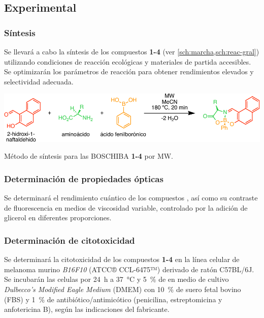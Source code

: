 \subsection{Experimental}
\subsubsection{Síntesis}
Se llevará a cabo la síntesis de los compuestos \textbf{1-4} (ver \cref{sch:marcha,sch:reac-gral}) utilizando condiciones de reacción ecológicas y materiales de partida accesibles. Se optimizarán los parámetros de reacción para obtener rendimientos elevados y selectividad adecuada.

\begin{scheme}[H]
	\centering
	\includegraphics[width=0.85\linewidth]{./Figuras/BO-General.pdf}
	\caption[Síntesis de las BOSCHIBA por MW]{Método de síntesis para las \gls{BOSCHIBA} \textbf{1-4} por \gls{MW}.}
	\label{sch:reac-gral}
\end{scheme}

\subsubsection{Determinación de propiedades ópticas}
Se determinará el rendimiento cuántico de los compuestos , así como su contraste de fluorescencia en medios de viscosidad variable, controlado por la adición de glicerol en diferentes proporciones.

\subsubsection{Determinación de citotoxicidad}
Se determinará la citotoxicidad de los compuestos \textbf{1-4} en la línea celular de melanoma murino \emph{B16F10} (ATCC® CCL-6475™) derivado de ratón C57BL/6J.
Se incubarán las celulas por \qty{24}{\hour} a \qty{37}{\degreeCelsius} y \qty{5}{\percent} de  en medio de cultivo \emph{Dulbecco's Modified Eagle Medium} (DMEM) con \qty{10}{\percent} de suero fetal bovino (FBS) y \qty{1}{\percent} de antibiótico/antimicótico (penicilina, estreptomicina y anfotericina B), según las indicaciones del fabricante.

